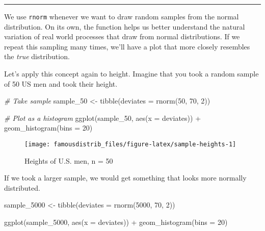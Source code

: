 \documentclass[
]{article}
\newenvironment{Shaded}{\begin{snugshade}}{\end{snugshade}}
\newcommand{\AttributeTok}[1]{\textcolor[rgb]{0.77,0.63,0.00}{#1}}
\newcommand{\CommentTok}[1]{\textcolor[rgb]{0.56,0.35,0.01}{\textit{#1}}}
\newcommand{\DecValTok}[1]{\textcolor[rgb]{0.00,0.00,0.81}{#1}}
\newcommand{\FunctionTok}[1]{\textcolor[rgb]{0.00,0.00,0.00}{#1}}
\newcommand{\NormalTok}[1]{#1}
\newcommand{\OtherTok}[1]{\textcolor[rgb]{0.56,0.35,0.01}{#1}}
\newcommand{\SpecialCharTok}[1]{\textcolor[rgb]{0.00,0.00,0.00}{#1}}
\begin{document}
\begin{center}\rule{0.5\linewidth}{0.5pt}\end{center}

We use \texttt{rnorm} whenever we want to draw random samples from the normal distribution. On its own, the function helps us better understand the natural variation of real world processes that draw from normal distributions. If we repeat this sampling many times, we'll have a plot that more closely resembles the \emph{true} distribution.

Let's apply this concept again to height. Imagine that you took a random sample of 50 US men and took their height.

\begin{Shaded}
\begin{Highlighting}[]
\CommentTok{\# Take sample}
\NormalTok{sample\_50 }\OtherTok{\textless{}{-}} \FunctionTok{tibble}\NormalTok{(}\AttributeTok{deviates =} \FunctionTok{rnorm}\NormalTok{(}\DecValTok{50}\NormalTok{, }\DecValTok{70}\NormalTok{, }\DecValTok{2}\NormalTok{))}

\CommentTok{\# Plot as a histogram}
\FunctionTok{ggplot}\NormalTok{(sample\_50, }\FunctionTok{aes}\NormalTok{(}\AttributeTok{x =}\NormalTok{ deviates)) }\SpecialCharTok{+}
  \FunctionTok{geom\_histogram}\NormalTok{(}\AttributeTok{bins =} \DecValTok{20}\NormalTok{)}
\end{Highlighting}
\end{Shaded}

\begin{figure}

{\centering \texttt{[image: famousdistrib\_files/figure-latex/sample-heights-1]} 

}

\caption{Heights of U.S. men, n = 50}\label{fig:sample-heights}
\end{figure}

If we took a larger sample, we would get something that looks more normally distributed.

\begin{Shaded}
\begin{Highlighting}[]
\NormalTok{sample\_5000 }\OtherTok{\textless{}{-}} \FunctionTok{tibble}\NormalTok{(}\AttributeTok{deviates =} \FunctionTok{rnorm}\NormalTok{(}\DecValTok{5000}\NormalTok{, }\DecValTok{70}\NormalTok{, }\DecValTok{2}\NormalTok{))}

\FunctionTok{ggplot}\NormalTok{(sample\_5000, }\FunctionTok{aes}\NormalTok{(}\AttributeTok{x =}\NormalTok{ deviates)) }\SpecialCharTok{+}
  \FunctionTok{geom\_histogram}\NormalTok{(}\AttributeTok{bins =} \DecValTok{20}\NormalTok{)}
\end{Highlighting}
\end{Shaded}
\end{document}
